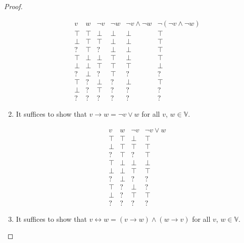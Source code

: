 \documentclass[12pt]{article}
\theoremstyle{definition}
\newenvironment{franck}{\color{red}}{\color{black}}
\begin{document}
\begin{franck}
\begin{proof}
\begin{enumerate}
\[
\begin{array}{ll|lll|l}
v     & w     & \neg v & \neg w & \neg v \wedge \neg w & \neg(\neg v \wedge \neg w)\\\hline
\top  & \top  & \perp  & \perp  & \perp                & \top\\
\perp & \top  & \top   & \perp  & \perp                & \top\\
?     & \top  & ?      & \perp  & \perp                & \top\\
\top  & \perp & \perp  & \top   & \perp                & \top\\
\perp & \perp & \top   & \top   & \top                 & \perp\\
?     & \perp & ?      & \top   & ?                    & ?\\
\top  & ?     & \perp  & ?      & \perp                & \top\\
\perp & ?     & \top   & ?      & ?                    & ?\\
?     & ?     & ?      & ?      & ?                    & ?
\end{array}
\]
\item
It suffices to show that $v \rightarrow w = \neg v \vee w$ for all $v$, $w \in \mathbb{V}$.

\[
\begin{array}{ll|l|l}
v     & w     & \neg v & \neg v \vee w\\\hline
\top  & \top  & \perp  & \top\\
\perp & \top  & \top   & \top\\
?     & \top  & ?      & \top\\
\top  & \perp & \perp  & \perp\\
\perp & \perp & \top   & \top\\
?     & \perp & ?      & ?\\
\top  & ?     & \perp  & ?\\
\perp & ?     & \top   & \top\\
?     & ?     & ?      & ?
\end{array}
\]
\item
It suffices to show that $v \leftrightarrow w = (v \rightarrow w) \wedge (w \rightarrow v)$ for all $v$, $w \in \mathbb{V}$.


\end{enumerate}
\end{proof}
\end{franck}
\end{document}
